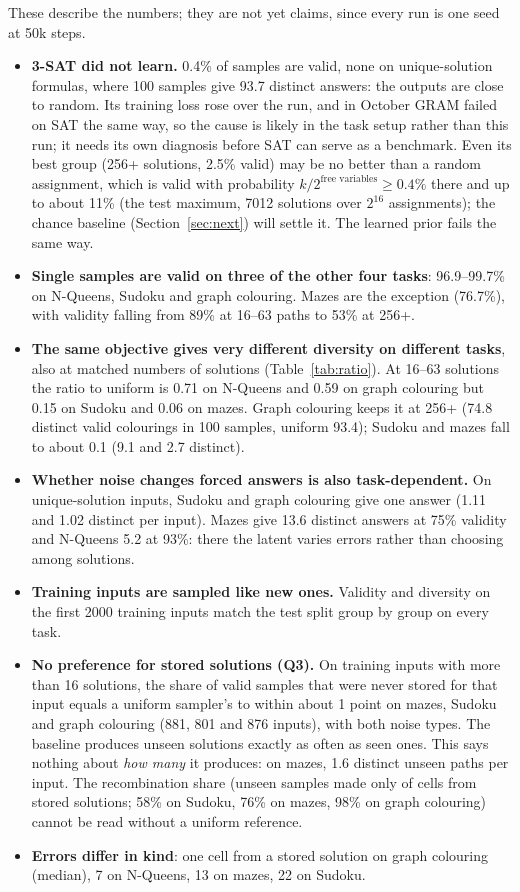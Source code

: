 \documentclass[11pt]{article}
\begin{document}
These describe the numbers; they are not yet claims, since every run is one seed at 50k steps.
\begin{itemize}
  \item \textbf{3-SAT did not learn.} 0.4\% of samples are valid, none on unique-solution formulas, where 100 samples
  give 93.7 distinct answers: the outputs are close to random. Its training loss rose over the run, and in October
  GRAM failed on SAT the same way, so the cause is likely in the task setup rather than this run; it needs its own
  diagnosis before SAT can serve as a benchmark. Even its best group (256+ solutions, 2.5\% valid) may be no better
  than a random assignment, which is valid with probability $k/2^{\text{free variables}}\ge 0.4\%$ there and up to
  about 11\% (the test maximum, 7012 solutions over $2^{16}$ assignments); the chance baseline (Section~\ref{sec:next}) will settle it. The learned prior fails the same way.
  \item \textbf{Single samples are valid on three of the other four tasks}: 96.9--99.7\% on N-Queens, Sudoku and
  graph colouring. Mazes are the exception (76.7\%), with validity falling from 89\% at 16--63 paths to 53\% at 256+.
  \item \textbf{The same objective gives very different diversity on different tasks}, also at matched numbers of
  solutions (Table~\ref{tab:ratio}). At 16--63 solutions the ratio to uniform is 0.71 on N-Queens and 0.59 on graph
  colouring but 0.15 on Sudoku and 0.06 on mazes. Graph colouring keeps it at 256+ (74.8 distinct valid colourings in
  100 samples, uniform 93.4); Sudoku and mazes fall to about 0.1 (9.1 and 2.7 distinct).
  \item \textbf{Whether noise changes forced answers is also task-dependent.} On unique-solution inputs, Sudoku and
  graph colouring give one answer (1.11 and 1.02 distinct per input). Mazes give 13.6 distinct answers at 75\%
  validity and N-Queens 5.2 at 93\%: there the latent varies errors rather than choosing among solutions.
  \item \textbf{Training inputs are sampled like new ones.} Validity and diversity on the first 2000 training inputs
  match the test split group by group on every task.
  \item \textbf{No preference for stored solutions (Q3).} On training inputs with more than 16 solutions, the share
  of valid samples that were never stored for that input equals a uniform sampler's to within about 1 point on
  mazes, Sudoku and graph colouring (881, 801 and 876 inputs), with both noise types. The baseline produces unseen
  solutions exactly as often as seen ones. This says nothing about \emph{how many} it produces: on mazes, 1.6 distinct
  unseen paths per input. The recombination share (unseen samples made only of cells from stored solutions; 58\% on
  Sudoku, 76\% on mazes, 98\% on graph colouring) cannot be read without a uniform reference.
  \item \textbf{Errors differ in kind}: one cell from a stored solution on graph colouring (median), 7 on N-Queens,
  13 on mazes, 22 on Sudoku.
\end{itemize}
\end{document}
